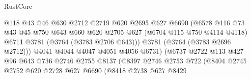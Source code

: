 \begin{lexlean}{RustCore}
\begin{coremodule}
                                      @118
                                      @43
                                      @46
                                      @630
                                      @2712
                                      @2719
                                      @620
                                      @2695
                                      @627
                                      @6690
                                      (@6578
                                        @116
                                        @73
                                        @43
                                        @45
                                        @750
                                        @643
                                        @660
                                        @620
                                        @2705
                                        @627
                                        (@6704 @115 @750 @4114 @4118)
                                        @6711
                                        @3781
                                        (@3764 (@3783 @2706 @643)))
                                      @3781
                                      (@3764 (@3783 @2696 @2712)))
                                    @4041
                                    @4044
                                    @4047
                                    @4051
                                    @4056
                                    @6731)
                                  (@6737
                                    @2722
                                    @113
                                    @427
                                    @96
                                    @643
                                    @736
                                    @2746
                                    @2755
                                    @8137
                                    (@8397
                                      @2746
                                      @2753
                                      @722
                                      (@8404
                                        @2745
                                        @2752
                                        @620
                                        @2728
                                        @627
                                        @6690
                                        (@8418
                                          @2738
                                          @627
                                          @8429

\end{coremodule}
\end{lexlean}
